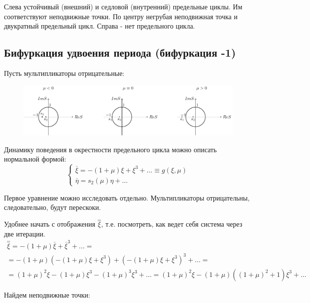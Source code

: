 Слева устойчивый (внешний) и седловой (внутренний) предельные циклы. Им соответствуют неподвижные точки. По центру негрубая неподвижная точка и двукратный предельный цикл. Справа - нет предельного цикла.

\subsection{Бифуркация удвоения периода (бифуркация -1)}
Пусть мультипликаторы отрицательные:
\begin{figure}[H]
	\centering
	\includegraphics[width=1\linewidth]{fig/fig67.pdf}   
\end{figure}

Динамику поведения в окрестности предельного цикла можно описать нормальной формой:
\begin{equation}
	\begin{cases}
		\stackrel{\_}{\xi}= -(1+\mu)\xi+\xi^3+\dots \equiv g(\xi,\mu)\\
		\stackrel{\_}{\eta}= s_2(\mu)\eta+\dots
	\end{cases}
	\label{eq:110}	
\end{equation}

Первое уравнение можно исследовать отдельно. Мультипликаторы отрицательны, следовательно, будут перескоки. 

Удобнее начать с отображения $\stackrel{=}{\xi}$, т.е. посмотреть, как ведет себя система через две итерации.
\begin{gather*}
	\stackrel{=}{\xi}=-(1+\mu)\stackrel{\_}{\xi}+\stackrel{\_}{\xi}^3+\dots= \\
	=-(1+\mu)(-(1+\mu)\xi+\xi^3)+(-(1+\mu)\xi+\xi^3)^3+\dots= \\
	=(1+\mu)^2\xi-(1+\mu)\xi^3-(1+\mu)^3\xi^3+\dots=(1+\mu)^2\xi-(1+\mu)((1+\mu)^2+1)\xi^3+\dots
\end{gather*}

Найдем неподвижные точки:



{}